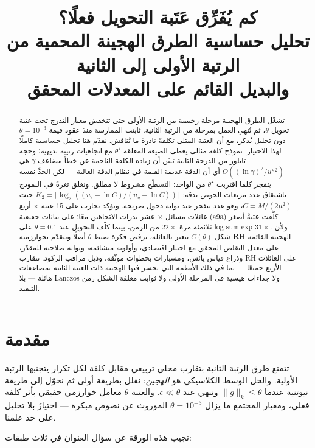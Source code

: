 ﻿\documentclass[12pt]{article}
\title{\bf كم يُفَرِّق عَتَبة التحويل فعلًا؟\\
\large تحليل حساسية الطرق الهجينة المحمية من الرتبة الأولى إلى الثانية\\
والبديل القائم على المعدلات المحقق}
\author{}
\date{}
\newcommand{\gnorm}{\lVert g\rVert}
\newcommand{\thetastar}{\theta^{\star}}
\begin{document}
\maketitle
\vspace{-3em}

\begin{abstract}
تشغّل الطرق الهجينة مرحلة رخيصة من الرتبة الأولى حتى تنخفض معيار التدرج
تحت عتبة تحويل $\theta$، ثم تُنهي العمل بمرحلة من الرتبة الثانية.
ثابتت الممارسة منذ عقود قيمة $\theta=10^{-3}$ دون تحليل يُذكر، مع أن
العتبة المثلى تكلفةً نادرةً ما تُناقش. نقدّم هنا تحليل حساسية كاملًا
لهذا الاختيار: نموذج كلفة مثالي يعطي الصيغة المغلقة
$\thetastar$ مع اتجاهيات رتيبة بديهية؛ وحجة تايلور من الدرجة الثانية
تبيّن أن زيادة الكلفة الناجمة عن خطأ مضاعف $\gamma$
هي $O((\ln\gamma)^2/u^{\star\,2})$ أي أن الدقة عديمة القيمة في نظام
الدقة العالية --- لكن الحدَّ نفسه \emph{ينفجر} كلما اقتربت
$\thetastar$ من الواحد: التسطّح مشروط لا مطلق. ونغلق ثغرةً في النموذج
باشتقاق عدد مربعات الحوض بدقة:
$K_2=\lceil\log_2((u_\epsilon-\ln C)/(u_g-\ln C))\rceil$ حيث
$C=M/(2\mu^2)$، وهو عدد ينفجر عند بوابة دخول صريحة. وتؤكد تجارب على
$15$ عتبة $\times$ أربع عائلات مسائل $\times$ عشر بذرات الاتجاهين معًا:
على بيانات حقيقية (a9a) كلّفت عتبةٌ أصغر ثلاثمئة مرة $22\times$ من
الزمن، بينما كلّف التحويل عند $\theta=0.1$ على log-sum-exp
$31\times$. ولأن شكل $C(\theta)$ يتغير بالعائلة، نرفض فكرة ضبط
$\theta$ أصلًا ونتقدّم بخوارزمية \textbf{RH} الهجينة القائمة على معدل
التقلص المحقق مع اختبار اقتصادي، وأولوية متشائمة، وبوابة صلاحية
للمقدّر، وذراع قياس يائس، ومسبارات بخطوات موثّقة، وذيل مراقب الركود.
تتقارب RH على العائلات الأربع جميعًا --- بما في ذلك الأنظمة التي تخسر
فيها الهجينة ذات العتبة الثابتة بمضاعفات هائلة --- بلا Lanczos ولا جداءات
هيسية في المرحلة الأولى ولا ثوابت مغلقة الشكل زمن التنفيذ.
\end{abstract}

\section{مقدمة}

تتمتع طرق الرتبة الثانية بتقارب محلي تربيعي مقابل كلفة لكل تكرار
يتجنبها الرتبة الأولية. والحل الوسط الكلاسيكي هو \emph{الهجين}: نقلل
بطريقة أولى ثم نحوّل إلى طريقة نيوتنية عندما
$\gnorm_k\le\theta$ وننهي عند $\epsilon\ll\theta$. والعتبة $\theta$
معامل خوارزمي حقيقي بأثر كلفة فعلي، ومعيار المجتمع ما يزال
$\theta=10^{-3}$ الموروث عن نصوص مبكرة --- اختيارٌ بلا تحليل على حد
علمنا.

تجيب هذه الورقة عن سؤال العنوان في ثلاث طبقات:
\end{document}
